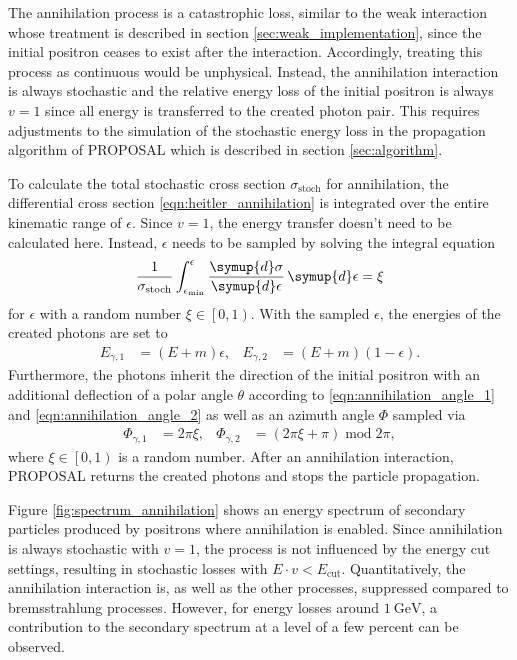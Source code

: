 The annihilation process is a catastrophic loss, similar to the weak interaction whose treatment is described in section \ref{sec:weak_implementation}, since the initial positron ceases to exist after the interaction.
Accordingly, treating this process as continuous would be unphysical.
Instead, the annihilation interaction is always stochastic and the relative energy loss of the initial positron is always $v=1$ since all energy is transferred to the created photon pair.
This requires adjustments to the simulation of the stochastic energy loss in the propagation algorithm of PROPOSAL which is described in section \ref{sec:algorithm}.

To calculate the total stochastic cross section $\sigma_{\text{stoch}}$ for annihilation, the differential cross section \eqref{eqn:heitler_annihilation} is integrated over the entire kinematic range of $\epsilon$.
Since $v=1$, the energy transfer doesn't need to be calculated here.
Instead, $\epsilon$ needs to be sampled by solving the integral equation
%
\begin{equation}
	\frac{1}{\sigma_{\text{stoch}}} \int_{\epsilon_{\text{min}}}^{\epsilon} \frac{\symup{d}\sigma}{\symup{d}\epsilon} \, \symup{d}\epsilon = \xi
\end{equation}
%
for $\epsilon$ with a random number $\xi \in \left[0,1\right)$.
With the sampled $\epsilon$, the energies of the created photons are set to
%
\begin{align}
	E_{\gamma,1} &= (E + m) \epsilon, & E_{\gamma,2} &= (E + m) (1 - \epsilon).
\end{align}
%
Furthermore, the photons inherit the direction of the initial positron with an additional deflection of a polar angle $\theta$ according to \eqref{eqn:annihilation_angle_1} and \eqref{eqn:annihilation_angle_2} as well as an azimuth angle $\Phi$ sampled via
%
\begin{align}
	\Phi_{\gamma,1} &= 2 \pi \xi, & \Phi_{\gamma,2} &= (2 \pi \xi + \pi) \;\mathrm{mod}\; 2 \pi,
\end{align}
%
where $\xi \in \left[0,1\right)$ is a random number.
After an annihilation interaction, PROPOSAL returns the created photons and stops the particle propagation.

Figure \ref{fig:spectrum_annihilation} shows an energy spectrum of secondary particles produced by positrons where annihilation is enabled.
Since annihilation is always stochastic with $v=1$, the process is not influenced by the energy cut settings, resulting in stochastic losses with $E \cdot v < {E_\text{cut}}$.
Quantitatively, the annihilation interaction is, as well as the other processes, suppressed compared to bremsstrahlung processes.
However, for energy losses around $\SI{1}{\giga\electronvolt}$, a contribution to the secondary spectrum at a level of a few percent can be observed.

